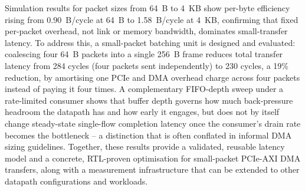 \documentclass[11pt, a4paper, oneside]{Thesis} %
\begin{document}
{Simulation results for packet sizes from 64~B to 4~KB show per-byte efficiency rising from 0.90~B/cycle at 64~B to 1.58~B/cycle at 4~KB, confirming that fixed per-packet overhead, not link or memory bandwidth, dominates small-transfer latency. To address this, a small-packet batching unit is designed and evaluated: coalescing four 64~B packets into a single 256~B frame reduces total transfer latency from 284 cycles (four packets sent independently) to 230 cycles, a 19\% reduction, by amortising one PCIe and DMA overhead charge across four packets instead of paying it four times. A complementary FIFO-depth sweep under a rate-limited consumer shows that buffer depth governs how much back-pressure headroom the datapath has and how early it engages, but does not by itself change steady-state single-flow completion latency once the consumer's drain rate becomes the bottleneck -- a distinction that is often conflated in informal DMA sizing guidelines. Together, these results provide a validated, reusable latency model and a concrete, RTL-proven optimisation for small-packet PCIe-AXI DMA transfers, along with a measurement infrastructure that can be extended to other datapath configurations and workloads.

}





\end{document}
